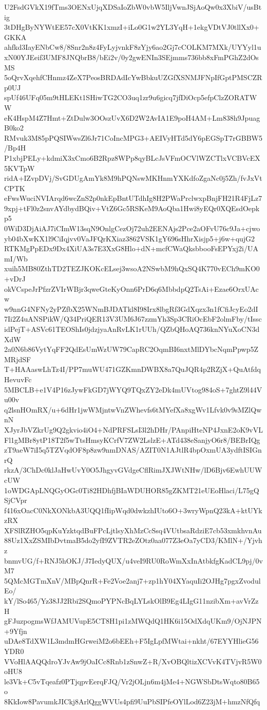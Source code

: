 U2FsdGVkX19fTms3OENxUjqXDSaIoZbW0vbW5IljVwnJSjAoQw0x3XbiV/usBtig
3tDHgByNYWtEE57cX0VtKK1xmzI+iLo0G1w2YL3YqH+1ekgVDtVJ0tllXx0+GKKA
ahfkd3IayENbCw8/8Snr2n8z4FyLyjvnkF8zYjy6ao2Gj7cCOLKM7MXk/UYYyl1u
xN00YJEeif3UMF8JNQbrB8/bEi2v/0y2gwENIn3SEjmms736bb8xFmPGhZ2dOsMS
5oQrvXqehfCHnmz4ZeX7PeosBRDAdIcYwBbkuUZGfXSNMJFNpIfGptPMSCZRp0UJ
spUf46UFq05m9tHLEKt1SHiwTG2CO3uq1zr9u6gicq7jfDiOcp5efpClzZORATWW
eK4HspM4Z7Hmt+ZtDulw3OOszUvX6D2W2AvIA1E9poH4AM+Lm838h9JpuagB0ko2
RMvuk3M85pPQSIWwsZl6Jr71CoIncMPG3+AEIVyHTd5dY6pEGSpT7rGBBW5/Bp4H
P1xbjPELy+kdmiX3xCmo6B2Rpz8WPp8qyBLcJsVFmOCVlWZCTlxVCBVcEX5KVTpW
ridA+IZvpDVj/SvGDUgAmYk8M9hPQNswMKHnmYXKdfoZgaNc0j5Zh/fvJxVtCPTK
eFwsWuciNVIArqd6wcZnS2p0nkEpBntUTdhIg8H2PWaPrclwxpBnjFH21R4FjLz7
9xpj+tFl0z2snvAYdbydBQiv+VtZ6Gc5RSKeM9AoQba1Hwi8yEQr0XQEsdOepkp5
0WiD3DjAiAJ7iCImW13sqN9OnlgCezOj72uh2EENAjs2Pce2aOFvU76c9Ja+cjwo
yb04bXwKX1l9CiIqjvv0VaJFQrKXiaz3862VSK1gY696sHhrXisjp5+j6w+qujG2
RTKMgPpEDx9Dx4XiUA3s7E3XxG8Hlo+dN+mcfCWaQksbbooFsEPYxj2i/UAmI/Wb
xuih5MB80ZthTD2TEZJKOKcELsej3wsoA2NSwbM9hQxSQ4K770vECh9mKO0+vDrJ
okVCspeJrPfzrZVIrWBjr3qweGteKyOnn6PrD6q6MbbdpQ2TsAi+Ezae6OrxUAcw
w9nnG4NFNy2yPZfbX25WNmBJDATkl8I98Irx8lbgRf3GdXqzx3n1fCfiJcyEo2dI
7Ii2Z4uANSPikW/Q34PriQER13V3UM6J67zzmYh3Sp3CRiOcEbF2olmFby/tIssc
idPejT+ASVc61TEOShIs0jdzjyaAnRvLK1rUUh/QZbQHoAQ736knNYuXoCN3dXdW
2a0N6b86VytYqFF2QdEsUmWzUW79CapRC2OqmBI6nxtMlDYbcNqmPpwp5ZMRjdSF
T+HAAaswLhTz4I/PP7muWU471GZKmnDWBX8a7QuJQR4p2RZjX+QuAtfdqHevuvFc
5MBCLB+e1V4P16zJywFkGD7jWYQ9TQxZY2eDk4mUVtog984oS+7ghtZ9l44Vu00v
q2lsnHOmRX/u+6dHr1jwWMjntwVnZWhevfs6tMYefXa8xgWv1Lfvk0v9sMZlQwnN
XJyrJbVZkrUg9Q2gkvio4iO4+NdPRFSLsI3l2hDHr/PAnpiHteNP4JxnE2oK9vVL
Fl1gMBr8ytP18T2f5wTtsHmsyKCrfV7ZW2LslzE+ATd438eSanjyO6r8/BEBrIQg
zT9aeW7iI5q5TZVqdOF8p8zw9nmDNAS/AZIT0N1AJtlR4bpOxmUA3ydftISIGnrQ
rkzA/3ChDc0klJaHwUvY0O5JhgyvGVdgeCflRimJXJWtNHw/lD6Bjv6EwhUUWcUW
1oWDGApLNQGyOGc0Ti82HDhfjBIaWDUHOR85gZKMT21eUEoHlaci/L75gQSjCVpr
f416xOacC0NkXONkbA3UQQ1fIipWqd0dwkzhIUto6O+3wryWpnQ23kA+ktUYkzRX
XFSlRZHO5qpKuYzktqdBuFPcLjtlsyXhMzCcSsq4VUtbsaRdziE7cb53xmkhvnAu
88Uz1XxZSMIbDvtmaB5do2yfI9ZVTR2eZOtz0aa077Z3eOa7yCD3/KMlN+/Yjvhz
bnmvUG/f+RNJ5hOKJ/J7IedyQUX/u4veI9RU0RoWmXxInAtbkfgKadCL9pj/0vM7
5QMcMGTmXnV/MBpQnrR+Fe2Voe2anj7+zp1hY04XYaquIi2OJHg7pgxZvodulEo/
kY/lSo465/Yz38JJ2Rbi2SQmoPYPNcBqLYLskOlB9Eg4LIgG11nzibXm+avVrZzH
gFJuzpogmsWfJAMUVupE5CT8H1pi1zMWQdQ1HK6i15OdXdqUKm9/OjNJPN+9Yfjn
uDAe8TdXW1L3mdmHGrweiM2o6bEEh+F5IgLpfMWtai+nkht/67EYYHlieG56YDR0
VVoHlAAQQdroYJvAw9jOaICc8Rnb1zSnwZ+R/XvOBQltizXCVvK4TVjvR5W0oHU8
le3Vk+C5vTqeafz0PTjqpvEerqFJQ/Vr2jOLjn6m4jMe4+NGWSbDtsWqto80B65o
8KkIow8PavumkJICkj8ArlQggWVUs4pfi9UuPbSIPfeOYlLod6Z23jM+hmzNfQfq
